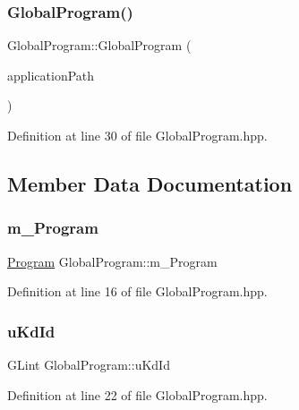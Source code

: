 \subsubsection{\texorpdfstring{Global\+Program()}{GlobalProgram()}}
{\footnotesize\ttfamily Global\+Program\+::\+Global\+Program (\begin{DoxyParamCaption}\item[{const \hyperlink{classglimac_1_1_file_path}{File\+Path} \&}]{application\+Path }\end{DoxyParamCaption})\hspace{0.3cm}{\ttfamily [inline]}}



Definition at line 30 of file Global\+Program.\+hpp.



\subsection{Member Data Documentation}
\mbox{\label{class_global_program_aeeb4dcb6959f5d9cd5866170f4641891}} 
\subsubsection{\texorpdfstring{m\+\_\+\+Program}{m\_Program}}
{\footnotesize\ttfamily \hyperlink{classglimac_1_1_program}{Program} Global\+Program\+::m\+\_\+\+Program}



Definition at line 16 of file Global\+Program.\+hpp.

\mbox{\label{class_global_program_aa57c5d88e8ebbc7c9673c5515529d822}} 
\subsubsection{\texorpdfstring{u\+Kd\+Id}{uKdId}}
{\footnotesize\ttfamily G\+Lint Global\+Program\+::u\+Kd\+Id}



Definition at line 22 of file Global\+Program.\+hpp.

\mbox{\label{class_global_program_a2bbd0ba4c150c90f4f6ea4f3a31f725f}} 
